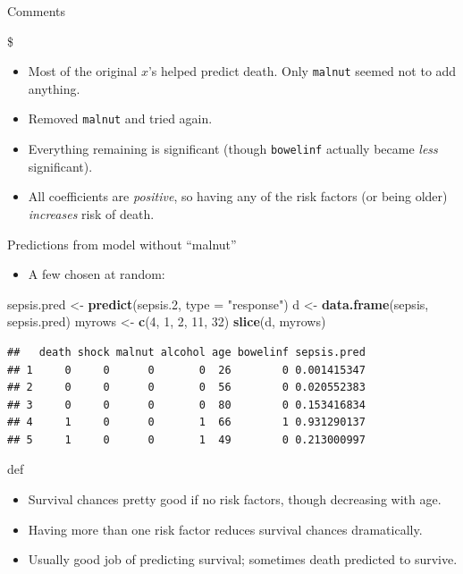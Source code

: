 \documentclass[ignorenonframetext,]{beamer}
\newenvironment{Shaded}{\begin{snugshade}}{\end{snugshade}}
\newcommand{\DataTypeTok}[1]{\textcolor[rgb]{0.13,0.29,0.53}{#1}}
\newcommand{\DecValTok}[1]{\textcolor[rgb]{0.00,0.00,0.81}{#1}}
\newcommand{\FloatTok}[1]{\textcolor[rgb]{0.00,0.00,0.81}{#1}}
\newcommand{\KeywordTok}[1]{\textcolor[rgb]{0.13,0.29,0.53}{\textbf{#1}}}
\newcommand{\NormalTok}[1]{#1}
\newcommand{\StringTok}[1]{\textcolor[rgb]{0.31,0.60,0.02}{#1}}
\providecommand{\tightlist}{%
  \setlength{\itemsep}{0pt}\setlength{\parskip}{0pt}}
\begin{document}
\begin{frame}[fragile]{Comments}
\protect\hypertarget{comments-11}{}

\$

\begin{itemize}
\item
  Most of the original \(x\)'s helped predict death. Only
  \texttt{malnut} seemed not to add anything.
\item
  Removed \texttt{malnut} and tried again.
\item
  Everything remaining is significant (though \texttt{bowelinf} actually
  became \emph{less} significant).
\item
  All coefficients are \emph{positive}, so having any of the risk
  factors (or being older) \emph{increases} risk of death.
\end{itemize}

\end{frame}

\begin{frame}[fragile]{Predictions from model without ``malnut''}
\protect\hypertarget{predictions-from-model-without-malnut}{}

\begin{itemize}
\tightlist
\item
  A few chosen at random:
\end{itemize}

\begin{Shaded}
\begin{Highlighting}[]
\NormalTok{sepsis.pred <-}\StringTok{ }\KeywordTok{predict}\NormalTok{(sepsis}\FloatTok{.2}\NormalTok{, }\DataTypeTok{type =} \StringTok{"response"}\NormalTok{)}
\NormalTok{d <-}\StringTok{ }\KeywordTok{data.frame}\NormalTok{(sepsis, sepsis.pred)}
\NormalTok{myrows <-}\StringTok{ }\KeywordTok{c}\NormalTok{(}\DecValTok{4}\NormalTok{, }\DecValTok{1}\NormalTok{, }\DecValTok{2}\NormalTok{, }\DecValTok{11}\NormalTok{, }\DecValTok{32}\NormalTok{)}
\KeywordTok{slice}\NormalTok{(d, myrows)}
\end{Highlighting}
\end{Shaded}

\begin{verbatim}
##   death shock malnut alcohol age bowelinf sepsis.pred
## 1     0     0      0       0  26        0 0.001415347
## 2     0     0      0       0  56        0 0.020552383
## 3     0     0      0       0  80        0 0.153416834
## 4     1     0      0       1  66        1 0.931290137
## 5     1     0      0       1  49        0 0.213000997
\end{verbatim}

def

\begin{itemize}
\item
  Survival chances pretty good if no risk factors, though decreasing
  with age.
\item
  Having more than one risk factor reduces survival chances
  dramatically.
\item
  Usually good job of predicting survival; sometimes death predicted to
  survive.
\end{itemize}

\end{frame}
\end{document}
